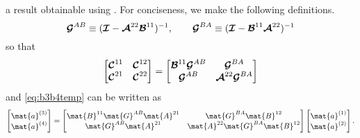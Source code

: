 a result obtainable using  
\cite[Exercise~1.3.12]{orte:87}.  For conciseness, we make the
following definitions.
\begin{equation}
  \boldsymbol{\mathcal{G}}^{AB} \equiv (\boldsymbol{\mathcal{I}} - \boldsymbol{\mathcal{A}}^{22} \boldsymbol{\mathcal{B}}^{11})^{-1}, \qquad
  \boldsymbol{\mathcal{G}}^{BA} \equiv (\boldsymbol{\mathcal{I}} - \boldsymbol{\mathcal{B}}^{11} \boldsymbol{\mathcal{A}}^{22})^{-1} 
\end{equation}
so that 
\begin{equation}
  \begin{bmatrix}
    \boldsymbol{\mathcal{C}}^{11} & \boldsymbol{\mathcal{C}}^{12} \\
    \boldsymbol{\mathcal{C}}^{21} & \boldsymbol{\mathcal{C}}^{22}
  \end{bmatrix}
  =
  \begin{bmatrix}
    \boldsymbol{\mathcal{B}}^{11} \boldsymbol{\mathcal{G}}^{AB} & \boldsymbol{\mathcal{G}}^{BA} \\
     \boldsymbol{\mathcal{G}}^{AB} &  \boldsymbol{\mathcal{A}}^{22} \boldsymbol{\mathcal{G}}^{BA} 
  \end{bmatrix}
\end{equation}
and \eqref{eq:b3b4temp} can be written as
\begin{equation}
  \colvec{\mat{a}\three \\ \mat{a}\four} 
  =
  \begin{bmatrix}
    \mat{B}^{11} \mat{G}^{AB} \mat{A}^{21} & \mat{G}^{BA} \mat{B}^{12} \\
    \mat{G}^{AB} \mat{A}^{21} & \mat{A}^{22} \mat{G}^{BA} \mat{B}^{12}
  \end{bmatrix}
  \colvec{\mat{a}\one \\ \mat{a}\two}.
  \label{eq:b3b4}
\end{equation}

